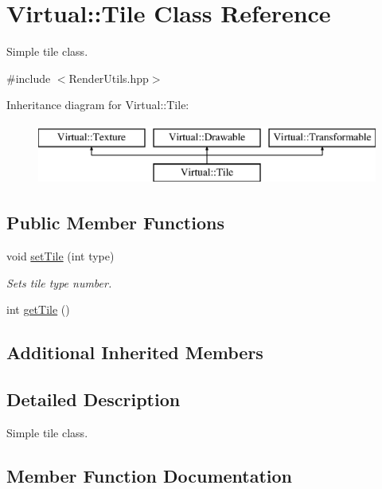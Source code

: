 \hypertarget{class_virtual_1_1_tile}{}\section{Virtual\+:\+:Tile Class Reference}
\label{class_virtual_1_1_tile}


Simple tile class.  




{\ttfamily \#include $<$Render\+Utils.\+hpp$>$}

Inheritance diagram for Virtual\+:\+:Tile\+:\begin{figure}[H]
\begin{center}
\leavevmode
\includegraphics[height=2.000000cm]{class_virtual_1_1_tile}
\end{center}
\end{figure}
\subsection*{Public Member Functions}
\begin{DoxyCompactItemize}
\item 
void \hyperlink{class_virtual_1_1_tile_a7e275a90e1b528130445c8e053d4dc66}{set\+Tile} (int type)
\begin{DoxyCompactList}\small\item\em Sets tile type number. \end{DoxyCompactList}\item 
int \hyperlink{class_virtual_1_1_tile_ae535b36cb182c5376739a4d6cdb7306b}{get\+Tile} ()
\end{DoxyCompactItemize}
\subsection*{Additional Inherited Members}


\subsection{Detailed Description}
Simple tile class. 

\subsection{Member Function Documentation}
\hypertarget{class_virtual_1_1_tile_ae535b36cb182c5376739a4d6cdb7306b}{}\label{class_virtual_1_1_tile_ae535b36cb182c5376739a4d6cdb7306b} 
